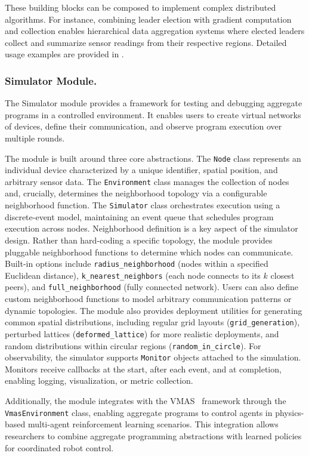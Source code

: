 \documentclass[runningheads]{llncs}
\begin{document}
These building blocks can be composed to implement complex distributed algorithms.
For instance, combining leader election with gradient computation and collection enables hierarchical data aggregation systems
where elected leaders collect and summarize sensor readings from their respective regions.
Detailed usage examples are provided in .

\subsubsection{Simulator Module.}
The Simulator module provides a framework for testing and debugging aggregate programs in a controlled environment.
It enables users to create virtual networks of devices, define their communication, and observe program execution over multiple rounds.

The module is built around three core abstractions.
The \texttt{Node} class represents an individual device characterized by a unique identifier, spatial position, and arbitrary sensor data.
The \texttt{Environment} class manages the collection of nodes and, crucially, determines the neighborhood topology via a configurable neighborhood function.
The \texttt{Simulator} class orchestrates execution using a discrete-event model, maintaining an event queue that schedules program execution across nodes.
%
Neighborhood definition is a key aspect of the simulator design.
Rather than hard-coding a specific topology, the module provides pluggable neighborhood functions to determine which nodes can communicate.
Built-in options include \texttt{radius\_neighborhood} (nodes within a specified Euclidean distance),
\texttt{k\_nearest\_neighbors} (each node connects to its $k$ closest peers), and \texttt{full\_neighborhood} (fully connected network).
Users can also define custom neighborhood functions to model arbitrary communication patterns or dynamic topologies.
%
The module also provides deployment utilities for generating common spatial distributions,
including regular grid layouts (\texttt{grid\_generation}), perturbed lattices (\texttt{deformed\_lattice}) for more realistic deployments, and random distributions within circular regions (\texttt{random\_in\_circle}).
%
For observability, the simulator supports \texttt{Monitor} objects attached to the simulation.
Monitors receive callbacks at the start, 
after each event, 
and at completion, enabling logging, visualization, 
or metric collection.

Additionally, the module integrates with the VMAS~\cite{bettini2022dars} framework through the \texttt{VmasEnvironment} class,
enabling aggregate programs to control agents in physics-based multi-agent reinforcement learning scenarios.
This integration allows researchers to combine aggregate programming abstractions with learned policies for coordinated robot control.
\end{document}
